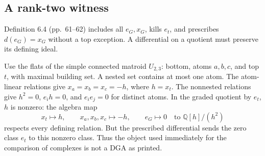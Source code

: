 \documentclass[10pt]{article}
\begin{document}
\subsection*{A rank-two witness}
Definition 6.4 (pp. 61–62) includes all \(e_G,x_G\), kills \(e_t\), and prescribes \(d(e_G)=x_G\) without a top exception. A differential on a quotient must preserve its defining ideal.\par
Use the flats of the simple connected matroid \(U_{2,3}\): bottom, atoms \(a,b,c\), and top \(t\), with maximal building set. A nested set contains at most one atom. The atom-linear relations give \(x_a=x_b=x_c=-h\), where \(h=x_t\). The nonnested relations give \(h^2=0\), \(e_i h=0\), and \(e_i e_j=0\) for distinct atoms. In the graded quotient by \(e_t\), \(h\) is nonzero: the algebra map \[x_t\mapsto h,\qquad x_a,x_b,x_c\mapsto-h,\qquad e_G\mapsto0
 \quad\text{to }\mathbb Q[h]/(h^2)\] respects every defining relation. But the prescribed differential sends the zero class \(e_t\) to this nonzero class. Thus the object used immediately for the comparison of complexes is not a DGA as printed.\par
\end{document}
